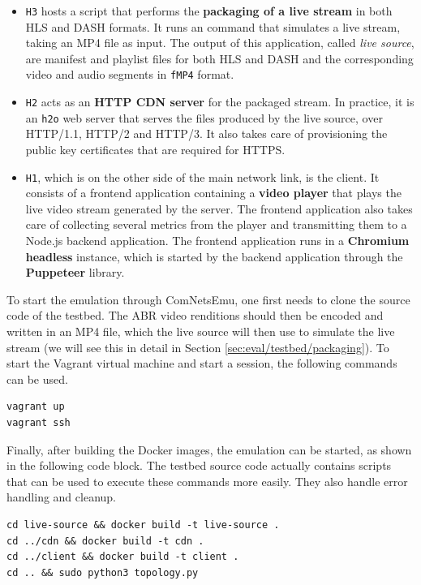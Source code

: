 \begin{itemize}
    \item \texttt{H3} hosts a script that performs the \textbf{packaging of a live stream} in both HLS and DASH formats. It runs an \ffmpeg{} command that simulates a live stream, taking an MP4 file as input. The output of this application, called \textit{live source}, are manifest and playlist files for both HLS and DASH and the corresponding video and audio segments in \texttt{fMP4} format.
    \item \texttt{H2} acts as an \textbf{HTTP CDN server} for the packaged stream. In practice, it is an \texttt{h2o} web server that serves the files produced by the live source, over HTTP/1.1, HTTP/2 and HTTP/3. It also takes care of provisioning the public key certificates that are required for HTTPS.
    \item \texttt{H1}, which is on the other side of the main network link, is the client. It consists of a frontend application containing a \textbf{video player} that plays the live video stream generated by the server. The frontend application also takes care of collecting several metrics from the player and transmitting them to a Node.js backend application. The frontend application runs in a \textbf{Chromium headless} instance, which is started by the backend application through the \textbf{Puppeteer} library.
\end{itemize}


To start the emulation through ComNetsEmu, one first needs to clone the source code of the testbed. The ABR video renditions should then be encoded and written in an MP4 file, which the live source will then use to simulate the live stream (we will see this in detail in Section \ref{sec:eval/testbed/packaging}). To start the Vagrant virtual machine and start a session, the following commands can be used.

\begin{verbatim}
vagrant up
vagrant ssh
\end{verbatim}

Finally, after building the Docker images, the emulation can be started, as shown in the following code block. The testbed source code actually contains scripts that can be used to execute these commands more easily. They also handle error handling and cleanup.

\begin{verbatim}
cd live-source && docker build -t live-source .
cd ../cdn && docker build -t cdn .
cd ../client && docker build -t client .
cd .. && sudo python3 topology.py
\end{verbatim}

